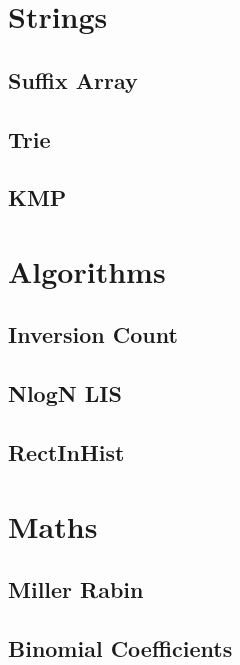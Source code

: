 \documentclass[twocolumn]{article}
\begin{document}
    \newpage
    \section{Strings}
        \subsection{Suffix Array}
        
        \subsection{Trie}
        
        \subsection{KMP}
        


    \newpage
    \section{Algorithms}
        \subsection{Inversion Count}
        
        \subsection{NlogN LIS}
        
        \subsection{RectInHist}
        

    \newpage
    \section{Maths}
        \subsection{Miller Rabin}
        
        \subsection{Binomial Coefficients}
        
        
\end{document}
